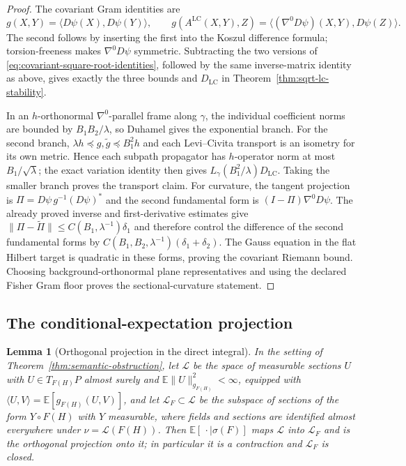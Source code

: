 \documentclass[11pt]{article}
\newtheorem{lemma}[theorem]{Lemma}
\theoremstyle{definition}
\theoremstyle{remark}
\newcommand{\E}{\mathbb{E}}
\newcommand{\LC}{\mathrm{LC}}
\begin{document}
\begin{proof}
The covariant Gram identities are
\begin{equation}
  g(X,Y)=\langle D\psi(X),D\psi(Y)\rangle,
  \qquad
  g(A^\LC(X,Y),Z)
  =\langle(\nabla^0D\psi)(X,Y),D\psi(Z)\rangle.
  \label{eq:covariant-square-root-identities}
\end{equation}
The second follows by inserting the first into the Koszul difference formula;
torsion-freeness makes $\nabla^0D\psi$ symmetric. Subtracting the two versions
of \eqref{eq:covariant-square-root-identities}, followed by the same
inverse-matrix identity as above, gives exactly the three bounds and
$D_{\LC}$ in Theorem~\ref{thm:sqrt-lc-stability}.

In an $h$-orthonormal $\nabla^0$-parallel frame along $\gamma$, the individual
coefficient norms are bounded by $B_1B_2/\lambda$, so Duhamel gives the
exponential branch. For the second branch,
$\lambda h\preceq g,\widetilde g\preceq B_1^2h$ and each Levi--Civita transport
is an isometry for its own metric. Hence each subpath propagator has
$h$-operator norm at most $B_1/\sqrt\lambda$; the exact variation identity
then gives $L_\gamma(B_1^2/\lambda)D_{\LC}$. Taking the smaller branch proves
the transport claim. For curvature, the tangent projection is
$\Pi=D\psi\,g^{-1}(D\psi)^*$ and the second fundamental form is
$(I-\Pi)\nabla^0D\psi$. The already proved inverse and first-derivative
estimates give
$\|\Pi-\widetilde\Pi\|\le C(B_1,\lambda^{-1})\delta_1$ and therefore control the
difference of the second fundamental forms by
$C(B_1,B_2,\lambda^{-1})(\delta_1+\delta_2)$. The Gauss equation in the flat
Hilbert target is quadratic in these forms, proving the covariant Riemann
bound. Choosing background-orthonormal plane representatives and using the
declared Fisher Gram floor proves the sectional-curvature statement.
\end{proof}

\subsection{The conditional-expectation projection}

\begin{lemma}[Orthogonal projection in the direct integral]\label{lem:direct-integral}
In the setting of Theorem~\ref{thm:semantic-obstruction}, let $\mathcal L$ be
the space of measurable sections $U$ with $U\in T_{F(H)}P$ almost surely and
$\E\|U\|_{g_{F(H)}}^2<\infty$, equipped with
$\langle U,V\rangle=\E[g_{F(H)}(U,V)]$, and let
$\mathcal L_F\subset\mathcal L$ be the subspace of sections of the form
$Y\circ F(H)$ with $Y$ measurable, where fields and sections are identified
almost everywhere under $\nu=\mathcal L(F(H))$. Then
$\E[\,\cdot\mid\sigma(F)]$ maps
$\mathcal L$ into $\mathcal L_F$ and is the orthogonal projection onto it; in
particular it is a contraction and $\mathcal L_F$ is closed.
\end{lemma}
\end{document}
